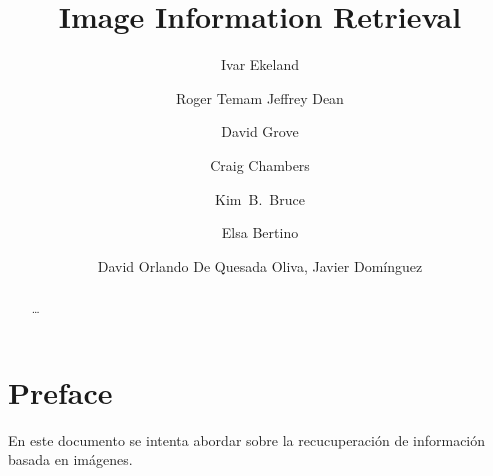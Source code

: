 \documentclass{llncs}
\begin{document}
\frontmatter          %
%

%
\chapter*{Preface}
%
En este documento se intenta abordar sobre la recucuperación de información basada en imágenes.


\tableofcontents
%
\mainmatter              %
%
\title{Image Information Retrieval}
%
%
\author{Ivar Ekeland \and Roger Temam
Jeffrey Dean \and David Grove \and Craig Chambers \and Kim~B.~Bruce \and
Elsa Bertino}

%
\author{David Orlando De Quesada Oliva, Javier Dom\'inguez}
%
%
%

\maketitle

\begin{abstract}
     \dots
    \end{abstract}

\section{}
\newpage
\end{document}
